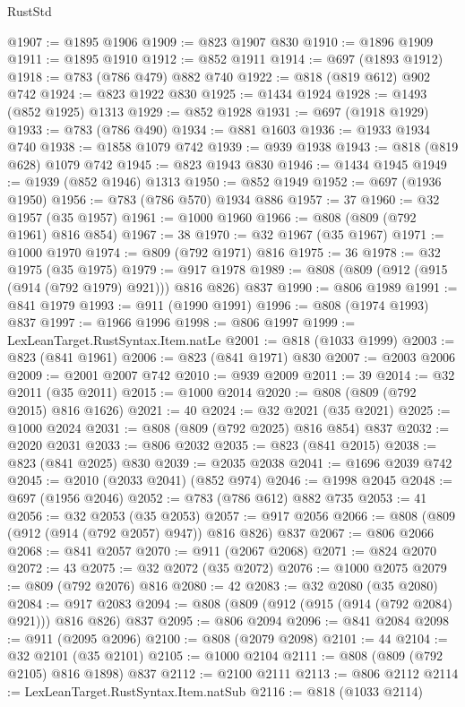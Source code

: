 \begin{lexlean}{RustStd}
\begin{coremodule}
@1907 := @1895 @1906
@1909 := @823 @1907 @830
@1910 := @1896 @1909
@1911 := @1895 @1910
@1912 := @852 @1911
@1914 := @697 (@1893 @1912)
@1918 := @783 (@786 @479) @882 @740
@1922 := @818 (@819 @612) @902 @742
@1924 := @823 @1922 @830
@1925 := @1434 @1924
@1928 := @1493 (@852 @1925) @1313
@1929 := @852 @1928
@1931 := @697 (@1918 @1929)
@1933 := @783 (@786 @490)
@1934 := @881 @1603
@1936 := @1933 @1934 @740
@1938 := @1858 @1079 @742
@1939 := @939 @1938
@1943 := @818 (@819 @628) @1079 @742
@1945 := @823 @1943 @830
@1946 := @1434 @1945
@1949 := @1939 (@852 @1946) @1313
@1950 := @852 @1949
@1952 := @697 (@1936 @1950)
@1956 := @783 (@786 @570) @1934 @886
@1957 := 37
@1960 := @32 @1957 (@35 @1957)
@1961 := @1000 @1960
@1966 := @808 (@809 (@792 @1961) @816 @854)
@1967 := 38
@1970 := @32 @1967 (@35 @1967)
@1971 := @1000 @1970
@1974 := @809 (@792 @1971) @816
@1975 := 36
@1978 := @32 @1975 (@35 @1975)
@1979 := @917 @1978
@1989 := @808 (@809 (@912 (@915 (@914 (@792 @1979) @921))) @816 @826) @837
@1990 := @806 @1989
@1991 := @841 @1979
@1993 := @911 (@1990 @1991)
@1996 := @808 (@1974 @1993) @837
@1997 := @1966 @1996
@1998 := @806 @1997
@1999 := LexLeanTarget.RustSyntax.Item.natLe
@2001 := @818 (@1033 @1999)
@2003 := @823 (@841 @1961)
@2006 := @823 (@841 @1971) @830
@2007 := @2003 @2006
@2009 := @2001 @2007 @742
@2010 := @939 @2009
@2011 := 39
@2014 := @32 @2011 (@35 @2011)
@2015 := @1000 @2014
@2020 := @808 (@809 (@792 @2015) @816 @1626)
@2021 := 40
@2024 := @32 @2021 (@35 @2021)
@2025 := @1000 @2024
@2031 := @808 (@809 (@792 @2025) @816 @854) @837
@2032 := @2020 @2031
@2033 := @806 @2032
@2035 := @823 (@841 @2015)
@2038 := @823 (@841 @2025) @830
@2039 := @2035 @2038
@2041 := @1696 @2039 @742
@2045 := @2010 (@2033 @2041) (@852 @974)
@2046 := @1998 @2045
@2048 := @697 (@1956 @2046)
@2052 := @783 (@786 @612) @882 @735
@2053 := 41
@2056 := @32 @2053 (@35 @2053)
@2057 := @917 @2056
@2066 := @808 (@809 (@912 (@914 (@792 @2057) @947)) @816 @826) @837
@2067 := @806 @2066
@2068 := @841 @2057
@2070 := @911 (@2067 @2068)
@2071 := @824 @2070
@2072 := 43
@2075 := @32 @2072 (@35 @2072)
@2076 := @1000 @2075
@2079 := @809 (@792 @2076) @816
@2080 := 42
@2083 := @32 @2080 (@35 @2080)
@2084 := @917 @2083
@2094 := @808 (@809 (@912 (@915 (@914 (@792 @2084) @921))) @816 @826) @837
@2095 := @806 @2094
@2096 := @841 @2084
@2098 := @911 (@2095 @2096)
@2100 := @808 (@2079 @2098)
@2101 := 44
@2104 := @32 @2101 (@35 @2101)
@2105 := @1000 @2104
@2111 := @808 (@809 (@792 @2105) @816 @1898) @837
@2112 := @2100 @2111
@2113 := @806 @2112
@2114 := LexLeanTarget.RustSyntax.Item.natSub
@2116 := @818 (@1033 @2114)

\end{coremodule}
\end{lexlean}
